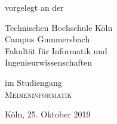 \documentclass[a4paper, 12pt]{scrartcl}
\begin{document}
\begin{titlepage}
\begin{center}
		\vspace{1.0cm}
		
		
		\begin{large}
			vorgelegt an der\\ 
			\vspace{0.2cm}
			\begin{scshape}
				Technischen Hochschule Köln\\
				Campus Gummersbach\\
				Fakultät für Informatik und\\
				Ingenieurwissenschaften\\
			\end{scshape}
		\end{large}
		
		\vspace{0.4cm}
		
		\begin{large}
			im Studiengang\\ 
			\vspace{0.2cm}
			\textsc{Medieninformatik}
		\end{large}
		
		
		\vspace{1.0cm}
		
	
		
		\begin{large}
			Köln, 25. Oktober 2019
		\end{large}
		
	\end{center}

\end{titlepage}
	
	\newpage
	\thispagestyle{empty}
	
	

	
\end{document}
